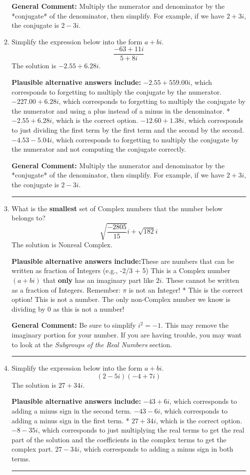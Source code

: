 \documentclass{extbook}[14pt]
\newcommand{\litem}[1]{\item #1

\rule{\textwidth}{0.4pt}}
\begin{document}
\begin{enumerate}
{\textbf{General Comment:} Multiply the numerator and denominator by the *conjugate* of the denominator, then simplify. For example, if we have $2+3i$, the conjugate is $2-3i$.
}
\litem{
Simplify the expression below into the form $a+bi$.
\[ \frac{-63 + 11 i}{5 + 8 i} \]The solution is \( -2.55  + 6.28 i \).\begin{enumerate}[label=\Alph*.]
\textbf{Plausible alternative answers include:} $-2.55  + 559.00 i$, which corresponds to forgetting to multiply the conjugate by the numerator.
 $-227.00  + 6.28 i$, which corresponds to forgetting to multiply the conjugate by the numerator and using a plus instead of a minus in the denominator.
* $-2.55  + 6.28 i$, which is the correct option.
 $-12.60  + 1.38 i$, which corresponds to just dividing the first term by the first term and the second by the second.
 $-4.53  - 5.04 i$, which corresponds to forgetting to multiply the conjugate by the numerator and not computing the conjugate correctly.
\end{enumerate}

\textbf{General Comment:} Multiply the numerator and denominator by the *conjugate* of the denominator, then simplify. For example, if we have $2+3i$, the conjugate is $2-3i$.
}
\litem{
What is the \textbf{smallest} set of Complex numbers that the number below belongs to?
\[ \sqrt{\frac{-2805}{15}} i+\sqrt{182}i \]The solution is \( \text{Nonreal Complex} \).\begin{enumerate}[label=\Alph*.]
\textbf{Plausible alternative answers include:}These are numbers that can be written as fraction of Integers (e.g., -2/3 + 5)
This is a Complex number $(a+bi)$ that \textbf{only} has an imaginary part like $2i$.
These cannot be written as a fraction of Integers. Remember: $\pi$ is not an Integer!
* This is the correct option!
This is not a number. The only non-Complex number we know is dividing by 0 as this is not a number!
\end{enumerate}

\textbf{General Comment:} Be sure to simplify $i^2 = -1$. This may remove the imaginary portion for your number. If you are having trouble, you may want to look at the \textit{Subgroups of the Real Numbers} section.
}
\litem{
Simplify the expression below into the form $a+bi$.
\[ (2 - 5 i)(-4 + 7 i) \]The solution is \( 27 + 34 i \).\begin{enumerate}[label=\Alph*.]
\textbf{Plausible alternative answers include:} $-43 + 6 i$, which corresponds to adding a minus sign in the second term.
 $-43 - 6 i$, which corresponds to adding a minus sign in the first term.
* $27 + 34 i$, which is the correct option.
 $-8 - 35 i$, which corresponds to just multiplying the real terms to get the real part of the solution and the coefficients in the complex terms to get the complex part.
 $27 - 34 i$, which corresponds to adding a minus sign in both terms.
\end{enumerate}

}
\end{enumerate}
\end{document}
